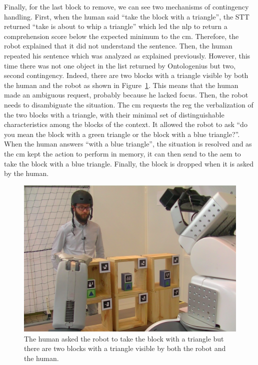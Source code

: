 \documentclass[a4paper,11pt,twoside]{StyleThese}
\begin{document}
Finally, for the last block to remove, we can see two mechanisms of contingency handling. First, when the human said ``take the block with a triangle'', the STT returned ``take is about to whip a triangle'' which led the \acrshort{nlp} to return a comprehension score below the expected minimum to the \acrshort{cm}. Therefore, the robot explained that it did not understand the sentence. Then, the human repeated his sentence which was analyzed as explained previously. However, this time there was not one object in the list returned by Ontologenius but two, second contingency. Indeed, there are two blocks with a triangle visible by both the human and the robot as shown in Figure~\ref{chap9:fig:triangles}. This means that the human made an ambiguous request, probably because he lacked focus. Then, the robot needs to disambiguate the situation. The \acrshort{cm} requests the \acrshort{reg} the verbalization of the two blocks with a triangle, with their minimal set of distinguishable characteristics among the blocks of the context. It allowed the robot to ask ``do you mean the block with a green triangle or the block with a blue triangle?''. When the human answers ``with a blue triangle'', the situation is resolved and as the \acrshort{cm} kept the action to perform in memory, it can then send to the \acrshort{aem} to take the block with a blue triangle. Finally, the block is dropped when it is asked by the human.


\begin{figure}[ht!]
	\centering
	\includegraphics[width=\textwidth]{figures/chapter4/triangles.png}
	\caption{\label{chap9:fig:triangles} The human asked the robot to take the block with a triangle but there are two blocks with a triangle visible by both the robot and the human.}
\end{figure}
\end{document}
